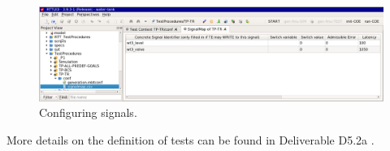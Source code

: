 %
%
%
\begin{figure}[ht]
    \begin{center}
        \includegraphics[width=1.0\textwidth]{figures/VSI-TDG_sc-mbt-configure-latency} 
    \end{center}
    \caption{Configuring signals.}
    \label{figure:RTTUI:signals}
\end{figure}
%
%
%
More details on the definition of tests can be found in Deliverable D5.2a \cite{INTOCPSD5.2a}.

